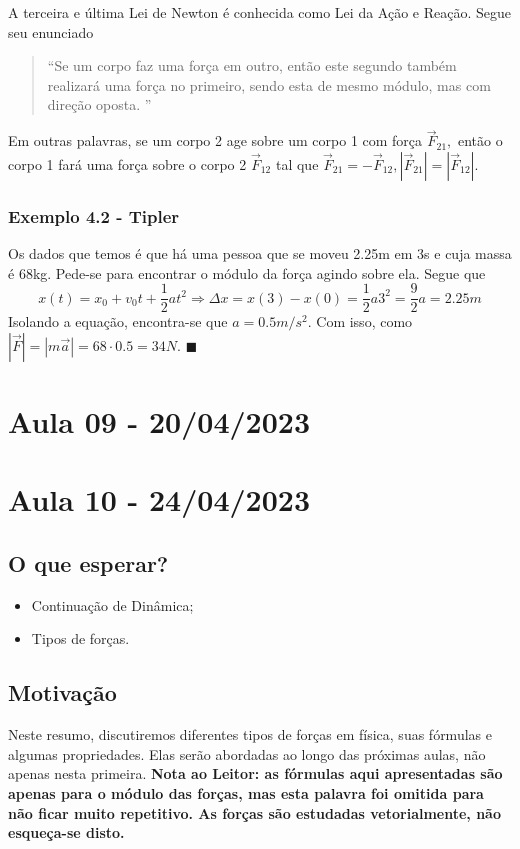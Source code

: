 \documentclass{article}
\renewcommand\qedsymbol{$\blacksquare$}
\begin{document}
  A terceira e \'ultima Lei de Newton \'e conhecida como Lei da A\c c\~ao e Rea\c c\~ao. Segue seu enunciado
 \begin{quote}
   ``Se um corpo faz uma for\c ca em outro, ent\~ao este segundo tamb\'em realizar\'a uma for\c ca no primeiro, sendo esta de
   mesmo m\'odulo, mas com dire\c c\~ao oposta. ''
 \end{quote}
  Em outras palavras, se um corpo 2 age sobre um corpo 1 com for\c ca $\vec{F}_{21},$ ent\~ao o corpo 1 far\'a uma for\c ca sobre
  o corpo 2 $\vec{F}_{12}$ tal que $\vec{F}_{21} = -\vec{F}_{12}, |\vec{F}_{21}| = |\vec{F}_{12}|$.

  \subsubsection{Exemplo 4.2 - Tipler}
  Os dados que temos \'e que h\'a uma pessoa que se moveu 2.25m em 3s e cuja massa \'e 68kg. Pede-se para encontrar o m\'odulo da for\c ca
agindo sobre ela. Segue que 
  $$
    x(t) = x_{0} + v_{0}t + \frac{1}{2}at^{2} \Rightarrow \Delta x = x(3) - x(0) = \frac{1}{2}a3^{2} = \frac{9}{2}a = 2.25m
  $$
  Isolando a equa\c c\~ao, encontra-se que $a = 0.5m/s^{2}.$ Com isso, como $|\vec{F}| = |m \vec{a}| = 68 \cdot 0.5 = 34N$. \qedsymbol
\newpage

\section{Aula 09 - 20/04/2023}

\newpage

\section{Aula 10 - 24/04/2023}
\subsection{O que esperar?}
\begin{itemize}
  \item Continua\c c\~ao de Din\^amica;
  \item Tipos de for\c cas.
\end{itemize}
\subsection{Motiva\c c\~ao}
Neste resumo, discutiremos diferentes tipos de forças em física, suas fórmulas e algumas propriedades. Elas ser\~ao abordadas ao longo
das pr\'oximas aulas, n\~ao apenas nesta primeira. \textbf{Nota ao Leitor: as f\'ormulas aqui apresentadas s\~ao apenas
para o m\'odulo das for\c cas, mas esta palavra foi omitida para n\~ao ficar muito repetitivo. As for\c cas s\~ao estudadas vetorialmente,
n\~ao esque\c ca-se disto.}
\end{document}
